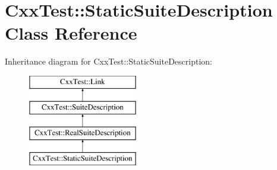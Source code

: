 \hypertarget{classCxxTest_1_1StaticSuiteDescription}{\section{Cxx\-Test\-:\-:Static\-Suite\-Description Class Reference}
\label{classCxxTest_1_1StaticSuiteDescription}
}
Inheritance diagram for Cxx\-Test\-:\-:Static\-Suite\-Description\-:\begin{figure}[H]
\begin{center}
\leavevmode
\includegraphics[height=4.000000cm]{classCxxTest_1_1StaticSuiteDescription}
\end{center}
\end{figure}
